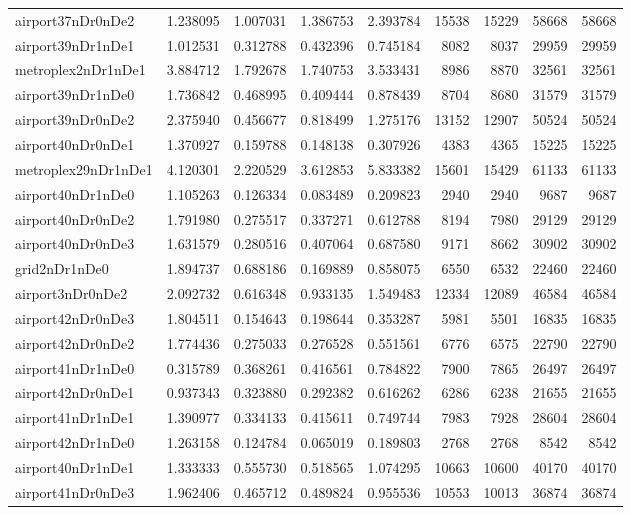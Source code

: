 \begin{longtable}{|l|r|r|r|r|r|r|r|r|}
airport37nDr0nDe2 & 1.238095 & 1.007031 & 1.386753 & 2.393784 & 15538 & 15229 & 58668 & 58668 \\
airport39nDr1nDe1 & 1.012531 & 0.312788 & 0.432396 & 0.745184 & 8082 & 8037 & 29959 & 29959 \\
metroplex2nDr1nDe1 & 3.884712 & 1.792678 & 1.740753 & 3.533431 & 8986 & 8870 & 32561 & 32561 \\
airport39nDr1nDe0 & 1.736842 & 0.468995 & 0.409444 & 0.878439 & 8704 & 8680 & 31579 & 31579 \\
airport39nDr0nDe2 & 2.375940 & 0.456677 & 0.818499 & 1.275176 & 13152 & 12907 & 50524 & 50524 \\
airport40nDr0nDe1 & 1.370927 & 0.159788 & 0.148138 & 0.307926 & 4383 & 4365 & 15225 & 15225 \\
metroplex29nDr1nDe1 & 4.120301 & 2.220529 & 3.612853 & 5.833382 & 15601 & 15429 & 61133 & 61133 \\
airport40nDr1nDe0 & 1.105263 & 0.126334 & 0.083489 & 0.209823 & 2940 & 2940 & 9687 & 9687 \\
airport40nDr0nDe2 & 1.791980 & 0.275517 & 0.337271 & 0.612788 & 8194 & 7980 & 29129 & 29129 \\
airport40nDr0nDe3 & 1.631579 & 0.280516 & 0.407064 & 0.687580 & 9171 & 8662 & 30902 & 30902 \\
grid2nDr1nDe0 & 1.894737 & 0.688186 & 0.169889 & 0.858075 & 6550 & 6532 & 22460 & 22460 \\
airport3nDr0nDe2 & 2.092732 & 0.616348 & 0.933135 & 1.549483 & 12334 & 12089 & 46584 & 46584 \\
airport42nDr0nDe3 & 1.804511 & 0.154643 & 0.198644 & 0.353287 & 5981 & 5501 & 16835 & 16835 \\
airport42nDr0nDe2 & 1.774436 & 0.275033 & 0.276528 & 0.551561 & 6776 & 6575 & 22790 & 22790 \\
airport41nDr1nDe0 & 0.315789 & 0.368261 & 0.416561 & 0.784822 & 7900 & 7865 & 26497 & 26497 \\
airport42nDr0nDe1 & 0.937343 & 0.323880 & 0.292382 & 0.616262 & 6286 & 6238 & 21655 & 21655 \\
airport41nDr1nDe1 & 1.390977 & 0.334133 & 0.415611 & 0.749744 & 7983 & 7928 & 28604 & 28604 \\
airport42nDr1nDe0 & 1.263158 & 0.124784 & 0.065019 & 0.189803 & 2768 & 2768 & 8542 & 8542 \\
airport40nDr1nDe1 & 1.333333 & 0.555730 & 0.518565 & 1.074295 & 10663 & 10600 & 40170 & 40170 \\
airport41nDr0nDe3 & 1.962406 & 0.465712 & 0.489824 & 0.955536 & 10553 & 10013 & 36874 & 36874 \\

\end{longtable}
